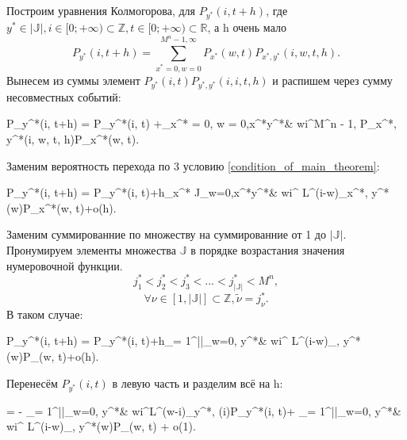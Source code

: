 Построим уравнения Колмогорова, для \(P_{y^*}(i, t + h)\), где \\
\(y^* \in |\mathbb{J}|, i \in [0;+\infty) \subset \mathbb{Z}, t \in [0;+\infty) \subset \mathbb{R}\), а h очень мало
\[P_{y^*}(i, t+h) = \sum_{x^* = 0, w = 0}^{M^n - 1,\infty}P_{x^*}(w, t)P_{x^*, y^*}(i, w, t, h).\]
Вынесем из суммы элемент \(P_{y^*}(i, t)P_{y^*, y^*}(i, i, t, h)\) и распишем через сумму несовместных событий:
\begin{urv}{60} 
	P_{y^*}(i, t+h) = \left[1 - \sum_{x^* = 0, w = 0,\atop x^*\neq y^*\& w\neq i}^{M^n - 1,\infty}
	P_{y^*, x^*}(i, w, t, h)\right]P_{y^*}(i, t)
	+\sum_{x^* = 0, w = 0,\atop x^*\neq y^*\& w\neq i}^{M^n - 1,\infty}
	P_{x^*, y^*}(i, w, t, h)P_{x^*}(w, t).
\end{urv}
Заменим вероятность перехода по 3 условию \eqref{condition_of_main_theorem}:
\begin{urv}{60}
	P_{y^*}(i, t+h) = \left[2 - h 
	\sum_{x^* \in J}\sum_{w=0,\atop x^*\neq y^*\& w\neq i}^{\infty}
	L^{(w-i)}_{y^*, x^*}(i)\right]
	P_{y^*}(i, t)+h\sum_{x^* \in J}\sum_{w=0,\atop x^*\neq y^*\& w\neq i}^{\infty}
	L^{(i-w)}_{x^*, y^*}(w)P_{x^*}(w, t)+o(h).
\end{urv}
Заменим суммированние по множеству на суммированние от 1 до \(|\mathbb{J}|\).
Пронумируем элементы множества \(\mathbb{J}\) в порядке возрастания значения нумеровочной функции.
\[j^*_1 < j^*_2 < j^*_3 <... < j^*_{|\mathbb{J}|} < M^n,\]
\[\forall \nu \in [1, |\mathbb{J}|] \subset \mathbb{Z}, \tilde{\nu} = j^*_{\nu}.\]
В таком случае:
\begin{urv}{60}
	P_{y^*}(i, t+h) = \left[1 - h 
	\sum_{\nu = 1}^{|\mathbb{J}|}\sum_{w=0,\atop \tilde{\nu} \neq y^*\& w\neq i}^{\infty}
	L^{(w-i)}_{ y^*, \tilde{\nu}}(i)\right]
	P_{y^*}(i, t)+h\sum_{\nu = 1}^{||}\sum_{w=0,\atop \tilde{\nu} \neq y^*\& w\neq i}^{\infty}
	L^{(i-w)}_{\tilde{\nu}, y^*}(w)P_{\tilde{\nu}}(w, t)+o(h).
\end{urv}
Перенесём \(P_{y^*}(i, t)\) в левую часть и разделим всё на h:
\begin{urv}{60}
	  =
	- \sum_{\nu = 1}^{||}\sum_{w=0,\atop \tilde{\nu} \neq y^*\& w\neq i}^{\infty}L^{(w-i)}_{y^*, \tilde{\nu}}(i)P_{y^*}(i, t)+
	\sum_{\nu = 1}^{||}\sum_{w=0,\atop \tilde{\nu} \neq y^*\& w\neq i}^{\infty}
	L^{(i-w)}_{\tilde{\nu}, y^*}(w)P_{\tilde{\nu}}(w, t) + o(1).
\end{urv}
